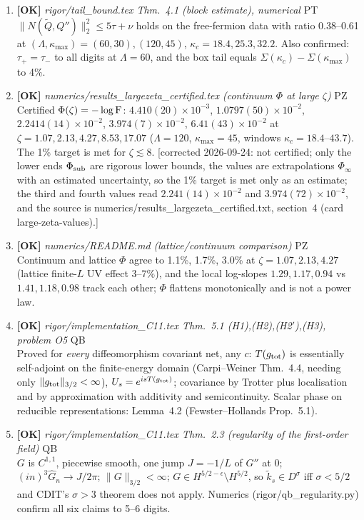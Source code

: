 \documentclass[11pt]{article}
\begin{document}
\begin{enumerate}[leftmargin=1.6em,itemsep=6pt]
\item \textbf{[OK]} \emph{rigor/tail\_bound.tex Thm.~4.1 (block estimate), numerical} \hfill\textsc{PT}\\ \(\|N(\widetilde Q,Q'')\|_2^2\le5\tau+\nu\) holds on the free-fermion data with ratio 0.38--0.61 at \((\Lambda,\kappa_{\max})=(60,30),(120,45)\), \(\kappa_c=18.4,25.3,32.2\). Also confirmed: \(\tau_+=\tau_-\) to all digits at \(\Lambda=60\), and the box tail equals \(\Sigma(\kappa_c)-\Sigma(\kappa_{\max})\) to 4\%.
\item \textbf{[OK]} \emph{numerics/results\_largezeta\_certified.tex (continuum \(\Phi\) at large \(\zeta\))} \hfill\textsc{PZ}\\ Certified \(\Phi(\zeta)=-\log\operatorname{F}\): \(4.410(20)\times10^{-3}\), \(1.0797(50)\times10^{-2}\), \(2.2414(14)\times10^{-2}\), \(3.974(7)\times10^{-2}\), \(6.41(43)\times10^{-2}\) at \(\zeta=1.07,2.13,4.27,8.53,17.07\) (\(\Lambda=120\), \(\kappa_{\max}=45\), windows \(\kappa_c=18.4\)--\(43.7\)). The 1\% target is met for \(\zeta\lesssim8\). [corrected 2026-09-24: not certified; only the lower ends \(\Phi_{\rm sub}\) are rigorous lower bounds, the values are extrapolations \(\Phi_\infty\) with an estimated uncertainty, so the 1\% target is met only as an estimate; the third and fourth values read \(2.241(14)\times10^{-2}\) and \(3.974(72)\times10^{-2}\), and the source is numerics/results\_largezeta\_certified.txt, section~4 (card large-zeta-values).]
\item \textbf{[OK]} \emph{numerics/README.md (lattice/continuum comparison)} \hfill\textsc{PZ}\\ Continuum and lattice \(\Phi\) agree to 1.1\%, 1.7\%, 3.0\% at \(\zeta=1.07,2.13,4.27\) (lattice finite-\(L\) UV effect 3--7\%), and the local log-slopes \(1.29,1.17,0.94\) vs \(1.41,1.18,0.98\) track each other; \(\Phi\) flattens monotonically and is not a power law.
\item \textbf{[OK]} \emph{rigor/implementation\_C11.tex Thm.~5.1 (H1),(H2),(H2$'$),(H3), problem O5} \hfill\textsc{QB}\\ Proved for \emph{every} diffeomorphism covariant net, any \(c\): \(T(g_{\rm tot})\) is essentially self-adjoint on the finite-energy domain (Carpi--Weiner Thm.~4.4, needing only \(\lVert g_{\rm tot}\rVert_{3/2}<\infty\)), \(U_s=e^{isT(g_{\rm tot})}\); covariance by Trotter plus localisation and by approximation with additivity and semicontinuity. Scalar phase on reducible representations: Lemma~4.2 (Fewster--Hollands Prop.~5.1).
\item \textbf{[OK]} \emph{rigor/implementation\_C11.tex Thm.~2.3 (regularity of the first-order field)} \hfill\textsc{QB}\\ \(G\) is \(C^{1,1}\), piecewise smooth, one jump \(J=-1/L\) of \(G''\) at \(0\); \((in)^3\hat G_n\to J/2\pi\); \(\lVert G\rVert_{3/2}<\infty\); \(G\in H^{5/2-\epsilon}\setminus H^{5/2}\), so \(\widetilde k_s\in D^\sigma\) iff \(\sigma<5/2\) and CDIT's \(\sigma>3\) theorem does not apply. Numerics (rigor/qb\_regularity.py) confirm all six claims to 5--6 digits.

\end{enumerate}
\end{document}
